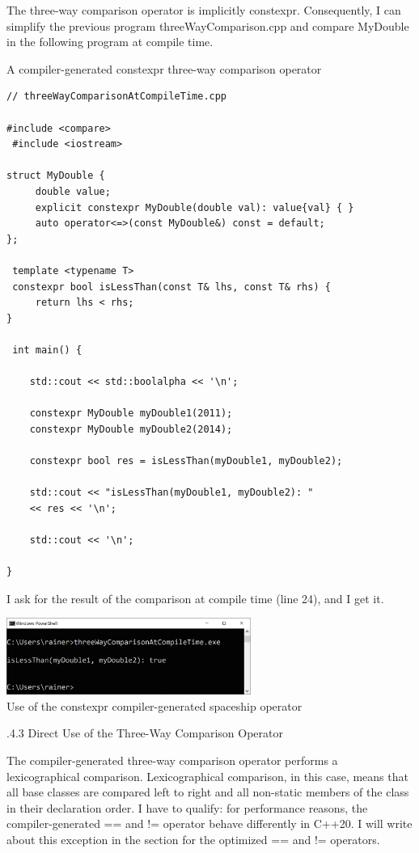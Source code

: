 The three-way comparison operator is implicitly constexpr. Consequently, I can simplify the previous program threeWayComparison.cpp and compare MyDouble in the following program at compile time.

\noindent
A compiler-generated constexpr three-way comparison operator
\begin{lstlisting}[style=styleCXX]
// threeWayComparisonAtCompileTime.cpp

#include <compare>
 #include <iostream>

struct MyDouble {
	 double value;
	 explicit constexpr MyDouble(double val): value{val} { }
	 auto operator<=>(const MyDouble&) const = default;
};

 template <typename T>
 constexpr bool isLessThan(const T& lhs, const T& rhs) {
	 return lhs < rhs;
}

 int main() {
	
	std::cout << std::boolalpha << '\n';
	
	constexpr MyDouble myDouble1(2011);
	constexpr MyDouble myDouble2(2014);
	
	constexpr bool res = isLessThan(myDouble1, myDouble2);
	
	std::cout << "isLessThan(myDouble1, myDouble2): "
	<< res << '\n';
	
	std::cout << '\n';

}
\end{lstlisting}

I ask for the result of the comparison at compile time (line 24), and I get it.

\begin{center}
\includegraphics[width=0.6\textwidth]{content/3/chapter4/images/30.png}\\
Use of the constexpr compiler-generated spaceship operator
\end{center}

.4.3\hspace{0.2cm} Direct Use of the Three-Way Comparison Operator



The compiler-generated three-way comparison operator performs a lexicographical comparison. Lexicographical comparison, in this case, means that all base classes are compared left to right and all non-static members of the class in their declaration order. I have to qualify: for performance reasons, the compiler-generated == and != operator behave differently in C++20. I will write about this exception in the section for the optimized == and != operators.


